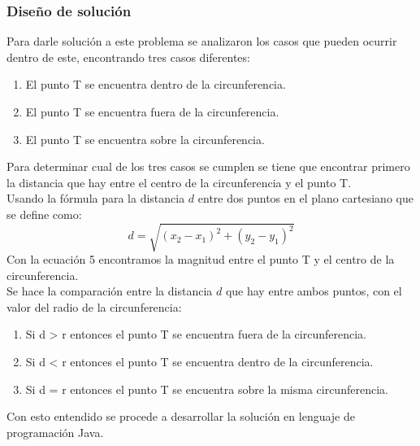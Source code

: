 \subsubsection{Diseño de solución}
Para darle solución a este problema se analizaron los casos que pueden ocurrir dentro de este, encontrando tres casos diferentes:
\begin{enumerate}
    \item El punto T se encuentra dentro de la circunferencia.
    \item El punto T se encuentra fuera de la circunferencia.
    \item El punto T se encuentra sobre la circunferencia.
\end{enumerate}
Para determinar cual de los tres casos se cumplen se tiene que encontrar primero la distancia que hay entre el centro de la circunferencia y el punto T.\\
Usando la fórmula para la distancia $d$ entre dos puntos en el plano cartesiano que se define como:
\begin{equation}
    d = \sqrt{(x_2-x_1)^2+(y_2-y_1)^2}
\end{equation}
Con la ecuación 5 encontramos la magnitud entre el punto T y el centro de la circunferencia.\\
Se hace la comparación entre la distancia $d$ que hay entre ambos puntos, con el valor del radio de la circunferencia:
\begin{enumerate}
    \item Si d > r entonces el punto T se encuentra fuera de la circunferencia.
    \item Si d < r entonces el punto T se encuentra dentro de la circunferencia.
    \item Si d = r entonces el punto T se encuentra sobre la misma circunferencia.
\end{enumerate}
Con esto entendido se procede a desarrollar la solución en lenguaje de programación Java.\\

